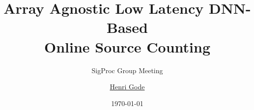 \documentclass[8pt,hyperref={pdfpagelabels=true},xcolor=table,aspectratio=169]{beamer}
\title{Array Agnostic Low Latency DNN-Based\\ Online Source Counting}
\subtitle{SigProc Group Meeting}
\date{\today}
\author[Henri Gode]{\underline{Henri Gode}}
\institute{Signal Processing Group}
\begin{document}
\begin{frame}
    \titlepage
\end{frame}

\end{document}
